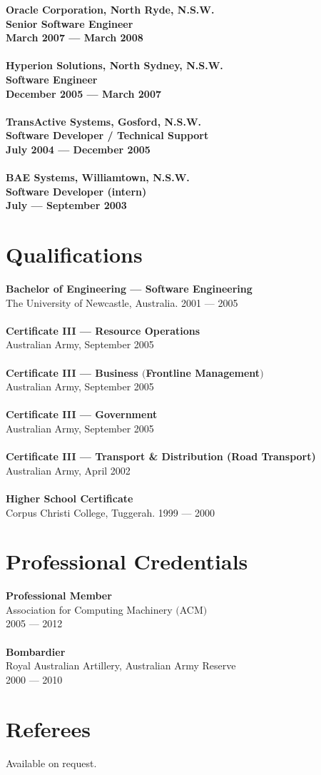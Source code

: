 \documentclass[a4paper]{article}
\begin{document}
\textbf{Oracle Corporation, North Ryde, N.S.W.\\Senior Software Engineer\\March 2007 --- March 2008}\\\\
\textbf{Hyperion Solutions, North Sydney, N.S.W.\\Software Engineer\\December 2005 --- March 2007} \\\\
\textbf{TransActive Systems, Gosford, N.S.W.\\Software Developer / Technical Support\\July 2004 --- December 2005}\\\\
\textbf{BAE Systems, Williamtown, N.S.W.\\Software Developer (intern)\\July --- September 2003}
\section*{Qualifications}
\textbf{Bachelor of Engineering --- Software Engineering}\\
The University of Newcastle, Australia. 2001 --- 2005\\\\
\textbf{Certificate III --- Resource Operations}\\
Australian Army, September 2005\\\\
\textbf{Certificate III --- Business $($Frontline Management$)$}\\
Australian Army, September 2005\\\\
\textbf{Certificate III --- Government}\\
Australian Army, September 2005\\\\
\textbf{Certificate III --- Transport \& Distribution (Road Transport)}\\
Australian Army, April 2002\\\\
\textbf{Higher School Certificate}\\
Corpus Christi College, Tuggerah. 1999 --- 2000
\vspace{5pt}
\section*{Professional Credentials}
\textbf{Professional Member}\\
Association for Computing Machinery $($ACM$)$\\
2005 --- 2012\\\\
\textbf{Bombardier}\\
Royal Australian Artillery, Australian Army Reserve\\
2000 --- 2010
\section*{Referees}
Available on request.
\end{document}
